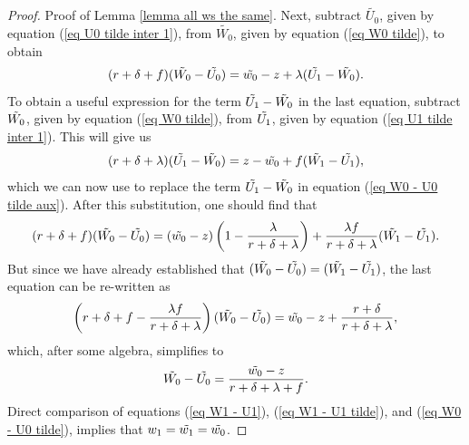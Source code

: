 \documentclass[12pt]{article} %
\theoremstyle{definition}
\begin{document}
\begin{appendix}
\begin{proof}{Proof of Lemma \ref{lemma all ws the same}.}
Next, subtract $\tilde{U_0}$, given by equation (\ref{eq U0 tilde inter 1}), from $\tilde{W_0}$, given by equation (\ref{eq W0 tilde}), to obtain 
\begin{equation}
 (r+\delta+f)(\Tilde{W_0}-\Tilde{U_0})=\Tilde{w_0}-z+\lambda(\Tilde{U_1}-\Tilde{W_0}). \label{eq W0 - U0 tilde aux}
\end{equation}To obtain a useful expression for the term $\Tilde{U_1}-\Tilde{W_0}$ in the last equation, subtract $\Tilde{W_0}$, given by equation (\ref{eq W0 tilde}), from $\Tilde{U_1}$, given by equation (\ref{eq U1 tilde inter 1}). This will give us   
\begin{equation}
(r+\delta+\lambda)(\Tilde{U_1}-\Tilde{W_0})=z-\Tilde{w_0}+f(\Tilde{W_1}-\Tilde{U_1}), \nonumber 
\end{equation}which we can now use to replace the term $\Tilde{U_1}-\Tilde{W_0}$ in equation (\ref{eq W0 - U0 tilde aux}). After this substitution, one should find that 
\begin{equation*}
(r+\delta+f)(\Tilde{W_0}-\Tilde{U_0})=(\Tilde{w_0}-z)\left(1-\frac{\lambda}{r+\delta+\lambda}\right) + \frac{\lambda f}{r+\delta+\lambda}(\Tilde{W_1}-\Tilde{U_1}).
\end{equation*}But since we have already established that $(\Tilde{W_0}-\Tilde{U_0})=(\Tilde{W_1}-\Tilde{U_1})$, the last equation can be re-written as 
\begin{equation*}
   \left(r+\delta+f-\frac{\lambda f}{r+\delta+\lambda}\right)(\Tilde{W_0}-\Tilde{U_0})=\Tilde{w_0}-z+\frac{r+\delta}{r+\delta+\lambda},  
\end{equation*}which, after some algebra, simplifies to  
\begin{equation}
      \Tilde{W_0}-\Tilde{U_0} = \frac{\Tilde{w_0}-z}{r+\delta+\lambda+f}.\label{eq W0 - U0 tilde}  
\end{equation}Direct comparison of equations (\ref{eq W1 - U1}), (\ref{eq W1 - U1 tilde}), and (\ref{eq W0 - U0 tilde}), implies that $w_1=\tilde{w_1}=\Tilde{w_0}$.


\end{proof}
\end{appendix}
\end{document}
